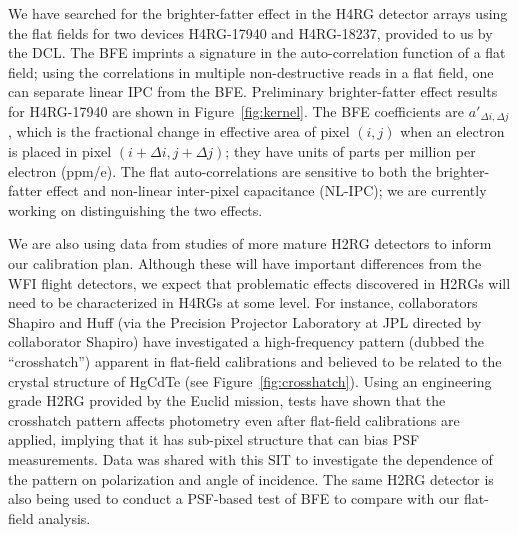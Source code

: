 We have searched for the brighter-fatter effect in the H4RG detector arrays
using the flat fields for two devices H4RG-17940 and H4RG-18237, provided to us
by the DCL. The BFE imprints a signature in the auto-correlation function of a
flat field; using the correlations in multiple non-destructive reads in a flat
field, one can separate linear IPC from the BFE. Preliminary brighter-fatter
effect results for H4RG-17940 are shown in Figure~\ref{fig:kernel}. The BFE
coefficients are $a'_{\Delta i,\Delta j}$, which is the fractional change in
effective area of pixel $(i,j)$ when an electron is placed in pixel $(i+\Delta
i, j+\Delta j)$; they have units of parts per million per electron (ppm/e). The
flat auto-correlations are sensitive to both the brighter-fatter effect and
non-linear inter-pixel capacitance (NL-IPC); we are currently working on
distinguishing the two effects.

We are also using data from studies of more mature H2RG detectors to inform our
calibration plan.  Although these will have important differences from the WFI
flight detectors, we expect that problematic effects discovered in H2RGs will
need to be characterized in H4RGs at some level.  For instance, collaborators
Shapiro and Huff (via the Precision Projector Laboratory at JPL directed by collaborator Shapiro) have
investigated a high-frequency pattern (dubbed the ``crosshatch'') apparent in
flat-field calibrations and believed to be related to the crystal structure of
HgCdTe (see Figure~\ref{fig:crosshatch}).  Using an engineering grade H2RG
provided by the Euclid mission, tests have shown that the crosshatch pattern
affects photometry even after flat-field calibrations are applied, implying that
it has sub-pixel structure that can bias PSF measurements.  Data was shared with
this SIT to investigate the dependence of the pattern on polarization and angle
of incidence.  The same H2RG detector is also being used to conduct a PSF-based
test of BFE to compare with our flat-field analysis.


